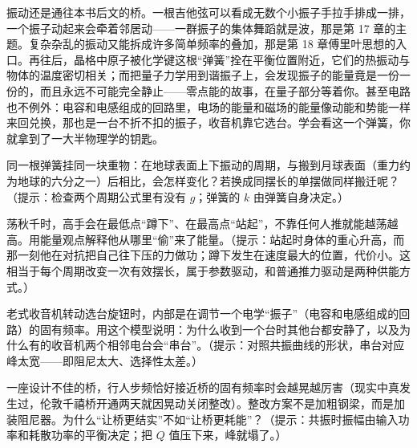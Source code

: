 振动还是通往本书后文的桥。一根吉他弦可以看成无数个小振子手拉手排成一排，一个振子动起来会牵着邻居动——一群振子的集体舞蹈就是波，那是第 17 章的主题。复杂杂乱的振动又能拆成许多简单频率的叠加，那是第 18 章傅里叶思想的入口。再往后，晶格中原子被化学键这根“弹簧”拴在平衡位置附近，它们的热振动与物体的温度密切相关；而把量子力学用到谐振子上，会发现振子的能量竟是一份一份的，而且永远不可能完全静止——零点能的故事，在量子部分等着你。甚至电路也不例外：电容和电感组成的回路里，电场的能量和磁场的能量像动能和势能一样来回兑换，那也是一台不折不扣的振子，收音机靠它选台。学会看这一个弹簧，你就拿到了一大半物理学的钥匙。

\begin{puzzles}
\item 同一根弹簧挂同一块重物：在地球表面上下振动的周期，与搬到月球表面（重力约为地球的六分之一）后相比，会怎样变化？若换成同摆长的单摆做同样搬迁呢？（提示：检查两个周期公式里有没有 \(g\)；弹簧的 \(k\) 由弹簧自身决定。）
\item 荡秋千时，高手会在最低点“蹲下”、在最高点“站起”，不靠任何人推就能越荡越高。用能量观点解释他从哪里“偷”来了能量。（提示：站起时身体的重心升高，而那一刻他在对抗把自己往下压的力做功；蹲下发生在速度最大的位置，代价小。这相当于每个周期改变一次有效摆长，属于参数驱动，和普通推力驱动是两种供能方式。）
\item 老式收音机转动选台旋钮时，内部是在调节一个电学“振子”（电容和电感组成的回路）的固有频率。用这个模型说明：为什么收到一个台时其他台都安静了，以及为什么有的收音机两个相邻电台会“串台”。（提示：对照共振曲线的形状，串台对应峰太宽——即阻尼太大、选择性太差。）
\item 一座设计不佳的桥，行人步频恰好接近桥的固有频率时会越晃越厉害（现实中真发生过，伦敦千禧桥开通两天就因晃动关闭整改）。整改方案不是加粗钢梁，而是加装阻尼器。为什么“让桥更结实”不如“让桥更耗能”？（提示：共振时振幅由输入功率和耗散功率的平衡决定；把 \(Q\) 值压下来，峰就塌了。）
\end{puzzles}
